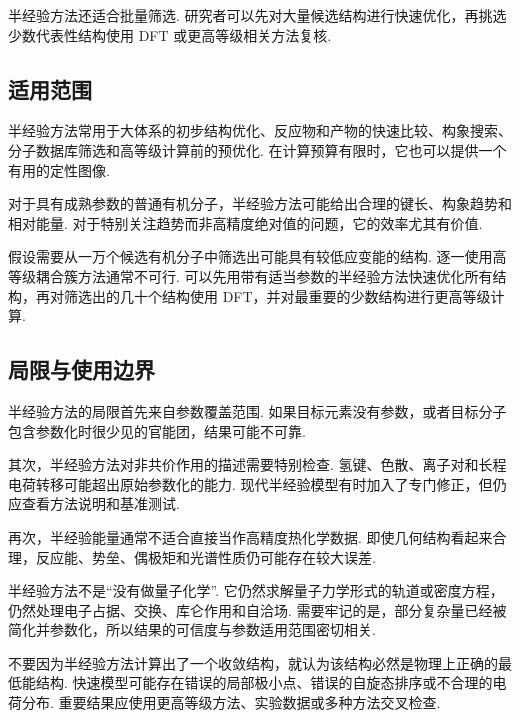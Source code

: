\documentclass[UTF8,11pt,a4paper,openany]{ctexbook}
\begin{document}
半经验方法还适合批量筛选. 研究者可以先对大量候选结构进行快速优化，再挑选少数代表性结构使用 DFT 或更高等级相关方法复核. 

\subsection{适用范围}

半经验方法常用于大体系的初步结构优化、反应物和产物的快速比较、构象搜索、分子数据库筛选和高等级计算前的预优化. 在计算预算有限时，它也可以提供一个有用的定性图像. 

对于具有成熟参数的普通有机分子，半经验方法可能给出合理的键长、构象趋势和相对能量. 对于特别关注趋势而非高精度绝对值的问题，它的效率尤其有价值. 

\begin{examplebox}
假设需要从一万个候选有机分子中筛选出可能具有较低应变能的结构. 逐一使用高等级耦合簇方法通常不可行. 可以先用带有适当参数的半经验方法快速优化所有结构，再对筛选出的几十个结构使用 DFT，并对最重要的少数结构进行更高等级计算. 
\end{examplebox}

\subsection{局限与使用边界}

半经验方法的局限首先来自参数覆盖范围. 如果目标元素没有参数，或者目标分子包含参数化时很少见的官能团，结果可能不可靠. 

其次，半经验方法对非共价作用的描述需要特别检查. 氢键、色散、离子对和长程电荷转移可能超出原始参数化的能力. 现代半经验模型有时加入了专门修正，但仍应查看方法说明和基准测试. 

再次，半经验能量通常不适合直接当作高精度热化学数据. 即使几何结构看起来合理，反应能、势垒、偶极矩和光谱性质仍可能存在较大误差. 

\begin{limitbox}
半经验方法不是“没有做量子化学”. 它仍然求解量子力学形式的轨道或密度方程，仍然处理电子占据、交换、库仑作用和自洽场. 需要牢记的是，部分复杂量已经被简化并参数化，所以结果的可信度与参数适用范围密切相关. 
\end{limitbox}

\begin{limitbox}
不要因为半经验方法计算出了一个收敛结构，就认为该结构必然是物理上正确的最低能结构. 快速模型可能存在错误的局部极小点、错误的自旋态排序或不合理的电荷分布. 重要结果应使用更高等级方法、实验数据或多种方法交叉检查. 
\end{limitbox}
\end{document}
